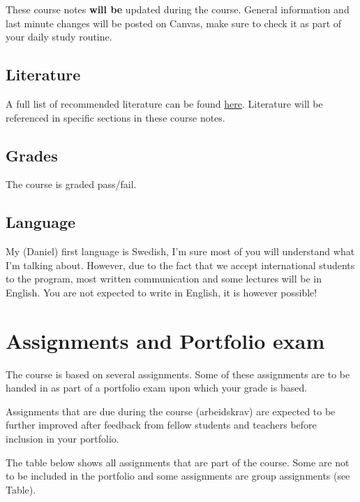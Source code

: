 \documentclass[
  11pt,
]{krantz}
\begin{document}
These course notes \textbf{will be} updated during the course. General information and last minute changes will be posted on Canvas, make sure to check it as part of your daily study routine.

\hypertarget{literature}{%
\subsection{Literature}\label{literature}}

A full list of recommended literature can be found \href{https://www.inn.no/pensum}{here}. Literature will be referenced in specific sections in these course notes.

\hypertarget{grades}{%
\subsection{Grades}\label{grades}}

The course is graded pass/fail.

\hypertarget{language}{%
\subsection{Language}\label{language}}

My (Daniel) first language is Swedish, I'm sure most of you will understand what I'm talking about. However, due to the fact that we accept international students to the program, most written communication and some lectures will be in English. You are not expected to write in English, it is however possible!

\hypertarget{assignments-and-portfolio-exam}{%
\section{Assignments and Portfolio exam}\label{assignments-and-portfolio-exam}}

The course is based on several assignments. Some of these assignments are to be handed in as part of a portfolio exam upon which your grade is based.

Assignments that are due during the course (arbeidskrav) are expected to be further improved after feedback from fellow students and teachers before inclusion in your portfolio.

The table below shows all assignments that are part of the course. Some are not to be included in the portfolio and some assignments are group assignments (see Table).
\end{document}
